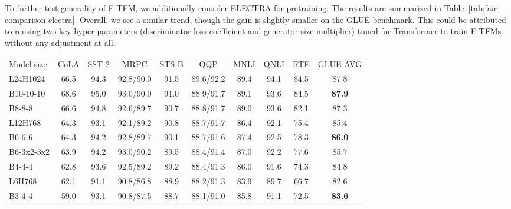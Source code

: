 \documentclass{article}
\theoremstyle{custom}
\begin{document}
To further test generality of F-TFM, we additionally consider ELECTRA for pretraining.
The results are summarized in Table~\ref{tab:fair-comparison-electra}.
Overall, we see a similar trend, though the gain is slightly smaller on the GLUE benchmark.
This could be attributed to reusing two key hyper-parameters (discriminator loss coefficient and generator size multiplier) tuned for Transformer to train F-TFMs without any adjustment at all. 
\begin{table}[!ht]
\centering
\small
\begin{tabular}{@{}lccccccccc@{}}
\toprule
Model size & CoLA & SST-2 & MRPC & STS-B & QQP & MNLI & QNLI & RTE & GLUE-AVG \\
\cmidrule(r){1-1} \cmidrule(lr){2-9} \cmidrule(l){10-10}
{L24H1024}
& 66.5 & 94.3 & 92.8/90.0 & 91.5 & 89.6/92.2 & 89.4 & 94.1 & 84.5 & 87.8 \\
{B10-10-10} 
& 68.6 & 95.0 & 93.0/90.0 & 91.0 & 88.9/91.7 & 89.1 & 93.6 & 84.5 & \bf 87.9 \\
{B8-8-8}
& 66.6 & 94.8 & 92.6/89.7 & 90.7 & 88.8/91.7 & 89.0 & 93.6 & 82.1 & 87.3 \\
\cmidrule(r){1-1} \cmidrule(lr){2-9} \cmidrule(l){10-10}
{L12H768}
& 64.3 & 93.1 & 92.1/89.2 & 90.8 & 88.7/91.7 & 86.4 & 92.1 & 75.4 & 85.4 \\
{B6-6-6} 
& 64.3 & 94.2 & 92.8/89.7 & 90.1 & 88.7/91.6 & 87.4 & 92.5 & 78.3 & \bf  86.0 \\
{B6-3x2-3x2}
& 63.9 & 94.2 & 93.0/90.2 & 89.5 & 88.4/91.4 & 87.0 & 92.2 & 77.6 & 85.7 \\
{B4-4-4}
& 62.8 & 93.6 & 92.5/89.2 & 89.2 & 88.4/91.3 & 86.0 & 91.6 & 74.3 & 84.8 \\
\cmidrule(r){1-1} \cmidrule(lr){2-9} \cmidrule(l){10-10}
{L6H768}
& 62.1 & 91.1 & 90.8/86.8 & 88.9 & 88.2/91.3 & 83.9 & 89.7 & 66.7 & 82.6 \\
{B3-4-4}
& 59.0 & 93.1 & 90.8/87.5 & 88.7 & 88.1/91.0 & 85.8 & 91.1 & 72.5 & \bf 83.6 \\
\bottomrule
\end{tabular}

\vspace{0.1em}


\end{table}
\end{document}
